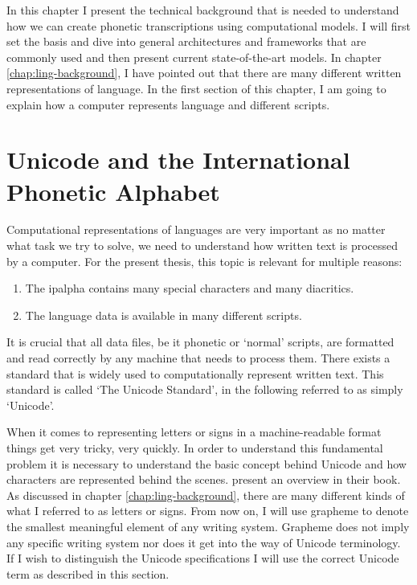 \label{chap:tech-background}
In this chapter I present the technical background that is needed to understand how we can create phonetic transcriptions using computational models. I will first set the basis and dive into general architectures and frameworks that are commonly used and then present current state-of-the-art models. In chapter \ref{chap:ling-background}, I have pointed out that there are many different written representations of language. In the first section of this chapter, I am going to explain how a computer represents language and different scripts. 

\section{Unicode and the International Phonetic Alphabet}
\label{sec:unicode_ipa}
Computational representations of languages are very important as no matter what task we try to solve, we need to understand how written text is processed by a computer. For the present thesis, this topic is relevant for multiple reasons: 
\begin{enumerate}
\item The \ac{ipalpha} contains many special characters and many diacritics.
\item The language data is available in many different scripts.
\end{enumerate} 

It is crucial that all data files, be it phonetic or `normal' scripts, are formatted and read correctly by any machine that needs to process them. There exists a standard that is widely used to computationally represent written text. This standard is called `The Unicode Standard', in the following referred to as simply `Unicode'. 

When it comes to representing letters or signs in a machine-readable format things get very tricky, very quickly. In order to understand this fundamental problem it is necessary to understand the basic concept behind Unicode and how characters are represented behind the scenes. \citet{unicode-lingu} present an overview in their book. As discussed in chapter \ref{chap:ling-background}, there are many different kinds of what I referred to as letters or signs. From now on, I will use grapheme to denote the smallest meaningful element of any writing system. Grapheme does not imply any specific writing system nor does it get into the way of Unicode terminology. If I wish to distinguish the Unicode specifications I will use the correct Unicode term as described in this section. 

